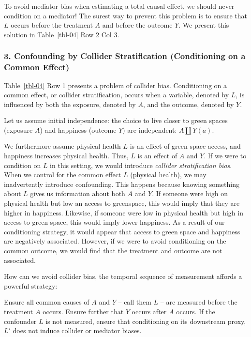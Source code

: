 \documentclass[
  singlecolumn]{article}
\begin{document}
To avoid mediator bias when estimating a total causal effect, we should
never condition on a mediator! The surest way to prevent this problem is
to ensure that \(L\) occurs before the treatment \(A\) and before the
outcome \(Y\). We present this solution in Table~\ref{tbl-04} Row 2 Col
3.

\subsubsection{3. Confounding by Collider Stratification (Conditioning
on a Common
Effect)}\label{confounding-by-collider-stratification-conditioning-on-a-common-effect}

Table~\ref{tbl-04} Row 1 presents a problem of collider bias.
Conditioning on a common effect, or collider stratification, occurs when
a variable, denoted by \(L\), is influenced by both the exposure,
denoted by \(A\), and the outcome, denoted by \(Y\).

Let us assume initial independence: the choice to live closer to green
spaces (exposure \(A\)) and happiness (outcome \(Y\)) are independent:
\(A \coprod Y(a)\).

We furthermore assume physical health \(L\) is an effect of green space
access, and happiness increases physical health. Thus, \(L\) is an
effect of \(A\) and \(Y\). If we were to condition on \(L\) in this
setting, we would introduce \emph{collider stratification bias}. When we
control for the common effect \(L\) (physical health), we may
inadvertently introduce confounding. This happens because knowing
something about \(L\) gives us information about both \(A\) and \(Y\).
If someone were high on physical health but low an access to greenspace,
this would imply that they are higher in happiness. Likewise, if someone
were low in physical health but high in access to green space, this
would imply lower happiness. As a result of our conditioning strategy,
it would appear that access to green space and happiness are negatively
associated. However, if we were to avoid conditioning on the common
outcome, we would find that the treatment and outcome are not
associated.

How can we avoid collider bias, the temporal sequence of measurement
affords a powerful strategy:

Ensure all common causes of \(A\) and \(Y\) -- call them \(L\) -- are
measured before the treatment \(A\) occurs. Ensure further that \(Y\)
occurs after \(A\) occurs. If the confounder \(L\) is not measured,
ensure that conditioning on its downstream proxy, \(L'\) does not induce
collider or mediator biases.
\end{document}
